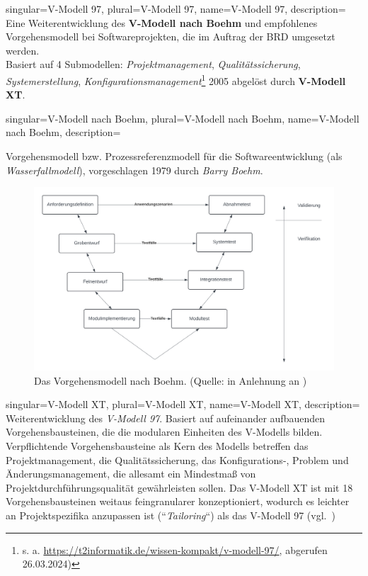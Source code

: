 
{
    singular={V-Modell 97},
    plural={V-Modell 97},
    name={V-Modell 97},
    description={
        Eine Weiterentwicklung des \textbf{V-Modell nach Boehm} und empfohlenes Vorgehensmodell bei Softwareprojekten, die im Auftrag der BRD umgesetzt werden.\\
        Basiert auf 4 Submodellen: \textit{Projektmanagement}, \textit{Qualitätssicherung}, \textit{Systemerstellung}, \textit{Konfigurationsmanagement}\footnote{s. a. \url{https://t2informatik.de/wissen-kompakt/v-modell-97/}, abgerufen 26.03.2024)}
        2005 abgelöst durch \textbf{V-Modell XT}.
    }
}

{
    singular={V-Modell nach Boehm},
    plural={V-Modell nach Boehm},
    name={V-Modell nach Boehm},
    description={
        Vorgehensmodell bzw. Prozessreferenzmodell für die Softwareentwicklung (als \textit{Wasserfallmodell}), vorgeschlagen 1979 durch \textit{Barry Boehm}.
        \begin{figure}
            \centering
            \includegraphics[scale=0.3]{chapters/Glossar/img/vmodell}
            \caption{Das Vorgehensmodell nach Boehm. (Quelle: in Anlehnung an \cite[554, Abb. 20.11-2]{Bal08})}
        \end{figure}
    }
}

{
    singular={V-Modell XT},
    plural={V-Modell XT},
    name={V-Modell XT},
    description={
        Weiterentwicklung des \textit{V-Modell 97}. Basiert auf aufeinander
        aufbauenden Vorgehensbausteinen, die die modularen Einheiten des
        V-Modells bilden. Verpflichtende Vorgehensbausteine als Kern des Modells
        betreffen das Projektmanagement, die Qualitätssicherung, das Konfigurations-,
        Problem und Änderungsmanagement, die allesamt ein Mindestmaß von Projektdurchführungsqualität
        gewährleisten sollen. Das V-Modell XT ist mit 18 Vorgehensbausteinen
        weitaus feingranularer konzeptioniert, wodurch es leichter an Projektspezifika
        anzupassen ist (``\textit{Tailoring}``) als das V-Modell 97 (vgl.~\cite[329 f.]{AABG14n})
    }
}

